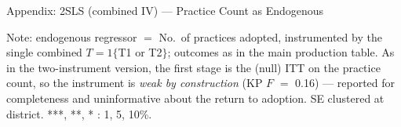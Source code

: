 \documentclass[aspectratio=169]{beamer}
\newcommand{\notefont}{\fontsize{5pt}{6pt}\selectfont}
\begin{document}
\begin{frame}{Appendix: 2SLS (combined IV) --- Practice Count as Endogenous}
	\centering
	\begin{minipage}{0.94\textwidth}
		\notefont
		Note: endogenous regressor $=$ No.\ of practices adopted, instrumented by the
		single combined $T = 1\{$T1 or T2$\}$; outcomes as in the main production table. As in
		the two-instrument version, the first stage is the (null) ITT on the practice count, so
		the instrument is \emph{weak by construction} (KP $F$ $=$ 0.16) --- reported for
		completeness and uninformative about the return to adoption. SE clustered at district.
		***, **, * : 1, 5, 10\%.
	\end{minipage}
\end{frame}
\end{document}
